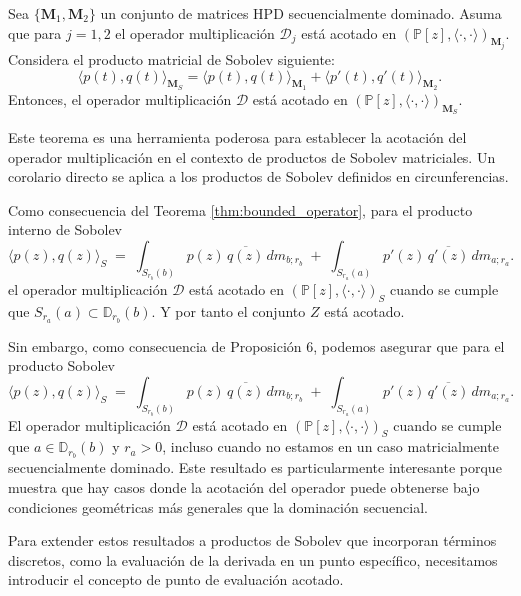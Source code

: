 \begin{theorem}\label{thm:bounded_operator}
	\cite{escribano2025boundedness} Sea $\{\textbf{M}_1,\textbf{M}_2\}$ un conjunto de matrices HPD secuencialmente dominado. Asuma que para $j=1,2$ el operador multiplicación $\mathcal{D}_j$ está acotado en $(\mathbb{P}[z],\langle \cdot,\cdot \rangle)_{\textbf{M}_j}$. Considera el producto matricial de Sobolev siguiente:
	$$\langle p(t),q(t) \rangle_{\textbf{M}_S}=\langle p(t),q(t) \rangle_{\textbf{M}_1}+\langle p'(t),q'(t) \rangle_{\textbf{M}_2}.$$
	Entonces, el operador multiplicación $\mathcal{D}$ está acotado en $(\mathbb{P}[z],\langle \cdot,\cdot \rangle)_{\textbf{M}_S}.$
\end{theorem}

Este teorema es una herramienta poderosa para establecer la acotación del operador multiplicación en el contexto de productos de Sobolev matriciales. Un corolario directo se aplica a los productos de Sobolev definidos en circunferencias.

\begin{corollary}\label{cor:seq_dominated_sobolev}
	Como consecuencia del Teorema \ref{thm:bounded_operator}, para el producto interno de Sobolev
	$$\langle p(z) , q(z) \rangle_{S}\;=\;
		\int_{S_{r_b}(b)} p(z)\,\overline{q(z)} \, dm_{b;r_b}
		\;+\;
		\int_{S_{r_a}(a)} p'(z)\,\overline{q'(z)} \, dm_{a;r_a}.$$
	el operador multiplicación $\mathcal{D}$ está acotado en $(\mathbb{P}[z],\langle \cdot,\cdot \rangle)_{S}$ cuando se cumple que $S_{r_a}(a)\subset \mathbb{D}_{r_b}(b)$. Y por tanto el conjunto $Z$ está acotado.
\end{corollary}

Sin embargo, como consecuencia de \cite{escribano2025zeros} Proposición 6, podemos asegurar que para el producto Sobolev
$$
	\langle p(z) , q(z) \rangle_{S}\;=\;
	\int_{S_{r_b}(b)} p(z)\,\overline{q(z)} \, dm_{b;r_b}
	\;+\;
	\int_{S_{r_a}(a)} p'(z)\,\overline{q'(z)} \, dm_{a;r_a}.
$$
El operador multiplicación $\mathcal{D}$ está acotado en $(\mathbb{P}[z],\langle \cdot,\cdot \rangle)_{S}$ cuando se cumple que $a \in \mathbb{D}_{r_b}(b)$ y $r_a > 0$, incluso cuando no estamos en un caso matricialmente secuencialmente dominado. Este resultado es particularmente interesante porque muestra que hay casos donde la acotación del operador puede obtenerse bajo condiciones geométricas más generales que la dominación secuencial.

Para extender estos resultados a productos de Sobolev que incorporan términos discretos, como la evaluación de la derivada en un punto específico, necesitamos introducir el concepto de punto de evaluación acotado.

